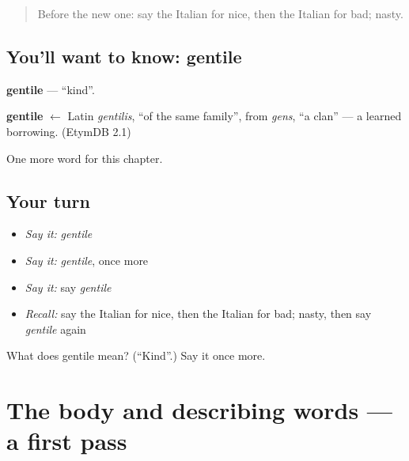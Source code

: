 \label{lesson:IT-C126-gentile}



\begin{quote}
Before the new one: say the Italian for nice, then the Italian for bad; nasty.
\end{quote}

\subsection*{You'll want to know: gentile}
\textbf{gentile} — \textquotedblleft{}kind\textquotedblright{}.

\begin{cousinweb}
\textbf{gentile} $\leftarrow$ Latin \emph{gentilis}, \textquotedblleft{}of the same family\textquotedblright{}, from \emph{gens}, \textquotedblleft{}a clan\textquotedblright{} — a learned borrowing. (EtymDB 2.1)
\end{cousinweb}

\begin{grammarlens}[title={What you've built}]
One more word for this chapter.
\end{grammarlens}

\subsection*{Your turn}
\begin{itemize}
\raggedright
  \item \emph{Say it:} \emph{gentile}
  \item \emph{Say it:} \emph{gentile}, once more
  \item \emph{Say it:} say \emph{gentile}
  \item \emph{Recall:} say the Italian for nice, then the Italian for bad; nasty, then say \emph{gentile} again
\end{itemize}

\begin{tcolorbox}[breakable,colback=teal!4,colframe=teal!35!black,title={Before you move on}]
What does gentile mean? (\textquotedblleft{}Kind\textquotedblright{}.) Say it once more.
\end{tcolorbox}
\section[(dialogue)]{The body and describing words — a first pass}

\label{lesson:IT-R126-first-pass-the-body-and-describing-words}



